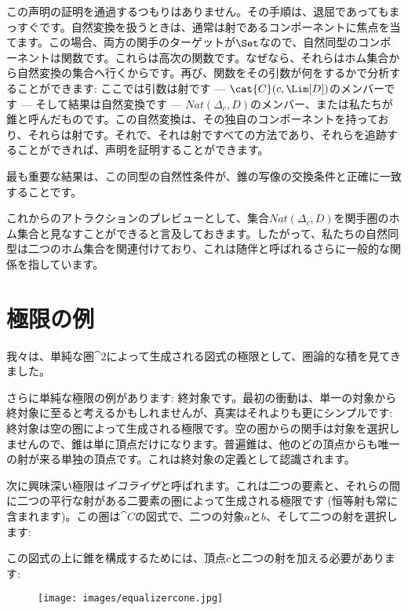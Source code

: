 この声明の証明を通過するつもりはありません。その手順は、退屈であってもまっすぐです。自然変換を扱うときは、通常は射であるコンポーネントに焦点を当てます。この場合、両方の関手のターゲットが$\Set$なので、自然同型のコンポーネントは関数です。これらは高次の関数です。なぜなら、それらはホム集合から自然変換の集合へ行くからです。再び、関数をその引数が何をするかで分析することができます: ここでは引数は射です --- $\cat{C}(c, \Lim[D])$のメンバーです --- そして結果は自然変換です --- $\mathit{Nat}(\Delta_c, D)$のメンバー、または私たちが錐と呼んだものです。この自然変換は、その独自のコンポーネントを持っており、それらは射です。それで、それは射ですべての方法であり、それらを追跡することができれば、声明を証明することができます。

最も重要な結果は、この同型の自然性条件が、錐の写像の交換条件と正確に一致することです。

これからのアトラクションのプレビューとして、集合$\mathit{Nat}(\Delta_c, D)$を関手圏のホム集合と見なすことができると言及しておきます。したがって、私たちの自然同型は二つのホム集合を関連付けており、これは随伴と呼ばれるさらに一般的な関係を指しています。

\section{極限の例}

我々は、単純な圏$\cat{2}$によって生成される図式の極限として、圏論的な積を見てきました。

さらに単純な極限の例があります: 終対象です。最初の衝動は、単一の対象から終対象に至ると考えるかもしれませんが、真実はそれよりも更にシンプルです: 終対象は空の圏によって生成される極限です。空の圏からの関手は対象を選択しませんので、錐は単に頂点だけになります。普遍錐は、他のどの頂点からも唯一の射が来る単独の頂点です。これは終対象の定義として認識されます。

次に興味深い極限は\emph{イコライザ}と呼ばれます。これは二つの要素と、それらの間に二つの平行な射がある二要素の圏によって生成される極限です (恒等射も常に含まれます)。この圏は$\cat{C}$の図式で、二つの対象$a$と$b$、そして二つの射を選択します: 


この図式の上に錐を構成するためには、頂点$c$と二つの射を加える必要があります: 


\begin{figure}[H]
  \centering
  \texttt{[image: images/equalizercone.jpg]}
\end{figure}


